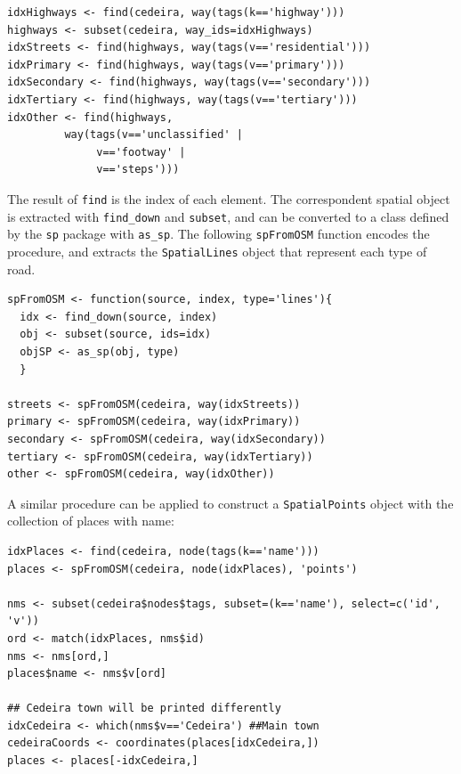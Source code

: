 
\lstset{language=R,numbers=none}
\begin{lstlisting}
idxHighways <- find(cedeira, way(tags(k=='highway')))
highways <- subset(cedeira, way_ids=idxHighways)
idxStreets <- find(highways, way(tags(v=='residential')))
idxPrimary <- find(highways, way(tags(v=='primary')))
idxSecondary <- find(highways, way(tags(v=='secondary')))
idxTertiary <- find(highways, way(tags(v=='tertiary')))
idxOther <- find(highways,
		 way(tags(v=='unclassified' |
			  v=='footway' |
			  v=='steps')))
\end{lstlisting}

The result of \texttt{find} is the index of each element. The correspondent
spatial object is extracted with \texttt{find\_down} and \texttt{subset}, and can be
converted to a class defined by the \texttt{sp} package with \texttt{as\_sp}. The
following \texttt{spFromOSM} function encodes the procedure, and extracts the
\texttt{SpatialLines} object that represent each type of road.


\lstset{language=R,numbers=none}
\begin{lstlisting}
spFromOSM <- function(source, index, type='lines'){
  idx <- find_down(source, index)
  obj <- subset(source, ids=idx)
  objSP <- as_sp(obj, type)
  }

streets <- spFromOSM(cedeira, way(idxStreets))
primary <- spFromOSM(cedeira, way(idxPrimary))
secondary <- spFromOSM(cedeira, way(idxSecondary))
tertiary <- spFromOSM(cedeira, way(idxTertiary))
other <- spFromOSM(cedeira, way(idxOther))
\end{lstlisting}

A similar procedure can be applied to construct a \texttt{SpatialPoints}
object with the collection of places with name:


\lstset{language=R,numbers=none}
\begin{lstlisting}
idxPlaces <- find(cedeira, node(tags(k=='name')))
places <- spFromOSM(cedeira, node(idxPlaces), 'points')

nms <- subset(cedeira$nodes$tags, subset=(k=='name'), select=c('id', 'v'))
ord <- match(idxPlaces, nms$id)
nms <- nms[ord,]
places$name <- nms$v[ord]

## Cedeira town will be printed differently
idxCedeira <- which(nms$v=='Cedeira') ##Main town
cedeiraCoords <- coordinates(places[idxCedeira,])
places <- places[-idxCedeira,]
\end{lstlisting}
